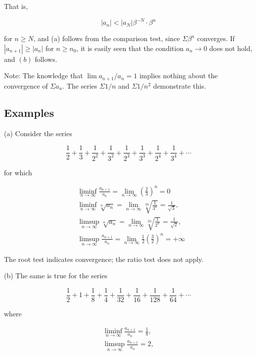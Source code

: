 \documentclass[10pt]{article}
\begin{document}
That is,

$$
\left|a_{n}\right|<\left|a_{N}\right| \beta^{-N} \cdot \beta^{n}
$$

for $n \geq N$, and (a) follows from the comparison test, since $\Sigma \beta^{n}$ converges. If $\left|a_{n+1}\right| \geq\left|a_{n}\right|$ for $n \geq n_{0}$, it is easily seen that the condition $a_{n} \rightarrow 0$ does not hold, and $(b)$ follows.

Note: The knowledge that $\lim a_{n+1} / a_{n}=1$ implies nothing about the convergence of $\Sigma a_{n}$. The series $\Sigma 1 / n$ and $\Sigma 1 / n^{2}$ demonstrate this.

\subsection{Examples}
(a) Consider the series

$$
\frac{1}{2}+\frac{1}{3}+\frac{1}{2^{2}}+\frac{1}{3^{2}}+\frac{1}{2^{3}}+\frac{1}{3^{3}}+\frac{1}{2^{4}}+\frac{1}{3^{4}}+\cdots
$$

for which

$$
\begin{aligned}
& \liminf _{n \rightarrow \infty} \frac{a_{n+1}}{a_{n}}=\lim _{n \rightarrow \infty}\left(\frac{2}{3}\right)^{n}=0 \\
& \liminf _{n \rightarrow \infty} \sqrt[n]{a_{n}}=\lim _{n \rightarrow \infty} \sqrt[2 n]{\frac{1}{3^{n}}}=\frac{1}{\sqrt{3}}, \\
& \limsup _{n \rightarrow \infty} \sqrt[n]{a_{n}}=\lim _{n \rightarrow \infty} \sqrt[2 n]{\frac{1}{2^{n}}}=\frac{1}{\sqrt{2}}, \\
& \limsup _{n \rightarrow \infty} \frac{a_{n+1}}{a_{n}}=\lim _{n \rightarrow \infty} \frac{1}{2}\left(\frac{3}{2}\right)^{n}=+\infty
\end{aligned}
$$

The root test indicates convergence; the ratio test does not apply.

(b) The same is true for the series

$$
\frac{1}{2}+1+\frac{1}{8}+\frac{1}{4}+\frac{1}{32}+\frac{1}{16}+\frac{1}{128}+\frac{1}{64}+\cdots
$$

where

$$
\begin{gathered}
\liminf _{n \rightarrow \infty} \frac{a_{n+1}}{a_{n}}=\frac{1}{8}, \\
\limsup _{n \rightarrow \infty} \frac{a_{n+1}}{a_{n}}=2,
\end{gathered}
$$
\end{document}
